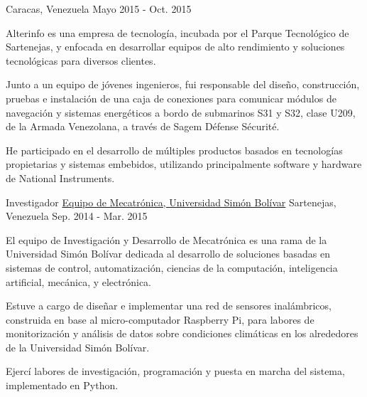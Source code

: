 \begin{cventries}
    {Caracas, Venezuela}
    {Mayo 2015 - Oct. 2015}
    {
    Alterinfo es una empresa de tecnología, incubada por el Parque Tecnológico de Sartenejas, y enfocada en desarrollar equipos de alto rendimiento y soluciones tecnológicas para diversos clientes.\vspace{4mm}
      \begin{cvitems}
        \item {Junto a un equipo de jóvenes ingenieros, fui responsable del diseño, construcción, pruebas e instalación de una caja de conexiones para comunicar módulos de navegación y sistemas energéticos a bordo de submarinos S31 y S32, clase U209, de la Armada Venezolana, a través de Sagem Défense Sécurité.}
        \item {He participado en el desarrollo de múltiples productos basados en tecnologías propietarias y sistemas embebidos, utilizando principalmente software y hardware de National Instruments.}
      \end{cvitems} 
    }
  \cventry
    {Investigador}
    {{\href{http://www.labc.usb.ve/mecatronica/}{Equipo de Mecatrónica, Universidad Simón Bolívar}}}
    {Sartenejas, Venezuela}
    {Sep. 2014 - Mar. 2015}
    {
     El equipo de Investigación y Desarrollo de Mecatrónica es una rama de la Universidad Simón Bolívar dedicada al desarrollo de soluciones basadas en sistemas de control, automatización, ciencias de la computación, inteligencia artificial, mecánica, y electrónica.\vspace{4mm}
      \begin{cvitems}
        \item {Estuve a cargo de diseñar e implementar una red de sensores inalámbricos, construida en base al micro-computador Raspberry Pi, para labores de monitorización y análisis de datos sobre condiciones climáticas en los alrededores de la Universidad Simón Bolívar.}
        \item {Ejercí labores de investigación, programación y puesta en marcha del sistema, implementado en Python.}
      \end{cvitems}
    }
\end{cventries}
